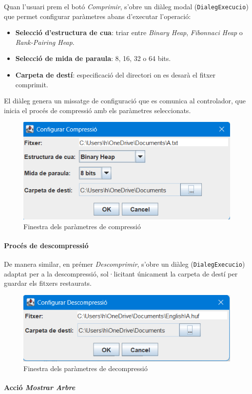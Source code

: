 \documentclass{ieeetj}
\begin{document}
Quan l'usuari prem el botó \emph{Comprimir}, s'obre un diàleg modal (\texttt{DialegExecucio}) que permet configurar paràmetres abans d'executar l'operació:
\begin{itemize}
    \item \textbf{Selecció d'estructura de cua}: triar entre \emph{Binary Heap}, \emph{Fibonnaci Heap} o \emph{Rank-Pairing Heap}.
    \item \textbf{Selecció de mida de paraula}: 8, 16, 32 o 64 bits.
    \item \textbf{Carpeta de destí}: especificació del directori on es desarà el fitxer comprimit.
\end{itemize}
El diàleg genera un missatge de configuració que es comunica al controlador, que inicia el procés de compressió amb els paràmetres seleccionats.
\begin{figure}[H]
    \centering
    \includegraphics[width=0.5\linewidth]{png/Fcompressio.png}
    \caption{Finestra dels paràmetres de compressió}
    \label{fig:enter-label}
\end{figure}

\paragraph{Procés de descompressió}

De manera similar, en prémer \emph{Descomprimir}, s'obre un diàleg (\texttt{DialegExecucio}) adaptat per a la descompressió, sol·licitant únicament la carpeta de destí per guardar els fitxers restaurats.
\begin{figure}[H]
    \centering
    \includegraphics[width=0.5\linewidth]{png/fDecompressio.png}
    \caption{Finestra dels paràmetres de decompressió}
    \label{fig:enter-label}
\end{figure}

\paragraph{Acció \emph{Mostrar Arbre}}
\end{document}
